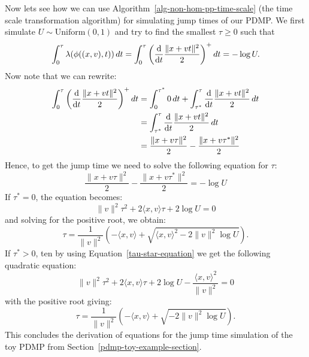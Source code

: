 \documentclass[report.tex]{subfiles}
\begin{document}
Now lets see how we can use Algorithm~\ref{alg-non-hom-pp-time-scale}
(the time scale transformation algorithm)
for simulating jump times of our PDMP. We first simulate
$U \sim \text{Uniform}(0, 1)$
and try to find the smallest $\tau \geq 0$ such that
$$
\int_{{0}}^{{\tau}} {\lambda(\phi((x, v), t))}\, d{t}
= \int_{{0}}^{{\tau}} {\left( \dv{}{t} \frac{\lVert x + vt \rVert^{2}}{2} \right)^{+}}\, d{t}
= -\log U.
$$
Now note that we can rewrite:
\begin{align*}
  \int_{{0}}^{{\tau}} {\left( \dv{}{t} \frac{\lVert x + vt \rVert^{2}}{2} \right)^{+}}\, d{t}
  &= \int_{{0}}^{{\tau^{*}}} {0}\, d{t}
  + \int_{{\tau^{*}}}^{{\tau}} {\dv{}{t} \frac{\lVert x + vt \rVert^{2}}{2}}\, d{t} \\
  &= \int_{{\tau^{*}}}^{{\tau}} {\dv{}{t} \frac{\lVert x + vt \rVert^{2}}{2}}\, d{t} \\
  &= \frac{\lVert x + v\tau \rVert^{2}}{2} - \frac{\lVert x + v\tau^{*} \rVert^{2}}{2} \\
\end{align*}
Hence, to get the jump time we need to solve the following equation for $\tau$:
$$
  \frac{\lVert x + v\tau \rVert^{2}}{2} - \frac{\lVert x + v\tau^{*} \rVert^{2}}{2}
  = -\log U
$$
If $\tau^{*} = 0$, the equation becomes:
$$
\lVert v \rVert^{2} \tau^{2} + 2 \langle x, v \rangle \tau + 2 \log U = 0
$$
and solving for the positive root, we obtain:
$$
\tau = \frac{1}{\lVert v \rVert^{2}} \left( - \langle x, v \rangle + \sqrt{\langle x, v \rangle^{2} - 2 \lVert v \rVert^{2} \log U} \right).
$$
If $\tau^{*} > 0$, ten by using Equation~\ref{tau-star-equation} we get the following quadratic equation:
$$
\lVert v \rVert^{2} \tau^{2} + 2 \langle x, v \rangle \tau + 2 \log U - \frac{\langle x, v \rangle^{2}}{\lVert v  \rVert^{2}}= 0
$$
with the positive root giving:
$$
\tau = \frac{1}{\lVert v \rVert^{2}} \left( - \langle x, v \rangle + \sqrt{- 2 \lVert v \rVert^{2} \log U} \right).
$$
This concludes the derivation of equations for the jump time simulation of the toy PDMP from Section~\ref{pdmp-toy-example-section}.
\end{document}
